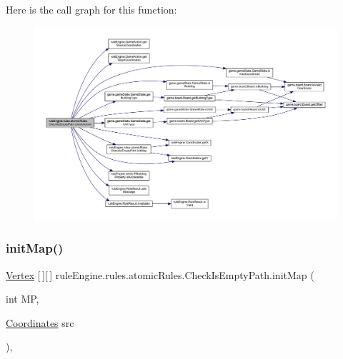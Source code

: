 Here is the call graph for this function\+:
\nopagebreak
\begin{figure}[H]
\begin{center}
\leavevmode
\includegraphics[width=350pt]{classrule_engine_1_1rules_1_1atomic_rules_1_1_check_is_empty_path_ad24f1d2f183a43c3a71d9716cf6d9413_cgraph}
\end{center}
\end{figure}
\mbox{\label{classrule_engine_1_1rules_1_1atomic_rules_1_1_check_is_empty_path_a46778793a7babd4a1ed13ffdf23a3794}} 
\subsubsection{\texorpdfstring{init\+Map()}{initMap()}}
{\footnotesize\ttfamily \mbox{\hyperlink{classrule_engine_1_1rules_1_1atomic_rules_1_1_check_is_empty_path_1_1_vertex}{Vertex}} \mbox{[}$\,$\mbox{]}\mbox{[}$\,$\mbox{]} rule\+Engine.\+rules.\+atomic\+Rules.\+Check\+Is\+Empty\+Path.\+init\+Map (\begin{DoxyParamCaption}\item[{int}]{MP,  }\item[{\mbox{\hyperlink{classrule_engine_1_1_coordinates}{Coordinates}}}]{src }\end{DoxyParamCaption})\hspace{0.3cm}{\ttfamily [inline]}, {\ttfamily [private]}}


